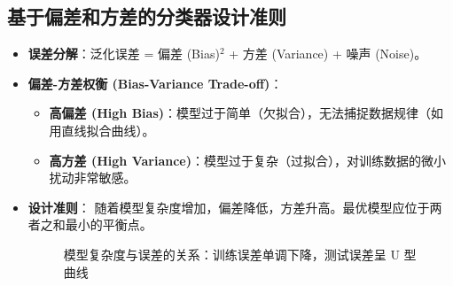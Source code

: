 \documentclass[a4paper, 11pt]{ctexart}
\begin{document}
\subsection{基于偏差和方差的分类器设计准则}
\begin{itemize}
    \item \textbf{误差分解}：泛化误差 = 偏差 (Bias)$^2$ + 方差 (Variance) + 噪声 (Noise)。
    \item \textbf{偏差-方差权衡 (Bias-Variance Trade-off)}：
    \begin{itemize}
        \item \textbf{高偏差 (High Bias)}：模型过于简单（欠拟合），无法捕捉数据规律（如用直线拟合曲线）。
        \item \textbf{高方差 (High Variance)}：模型过于复杂（过拟合），对训练数据的微小扰动非常敏感。
    \end{itemize}
    \item \textbf{设计准则}：
    随着模型复杂度增加，偏差降低，方差升高。最优模型应位于两者之和最小的平衡点。
    \begin{figure}[H]
        \centering
        \caption{模型复杂度与误差的关系：训练误差单调下降，测试误差呈 U 型曲线}
    \end{figure}
\end{itemize}
\end{document}
